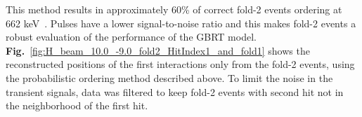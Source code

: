 This method results in approximately 60\% of correct fold-2 events ordering at 662 keV~\cite{Piqueras2004ADetectors}.
Pulses have a lower signal-to-noise ratio and this makes fold-2 events a robust evaluation of the performance of the GBRT model. \textbf{Fig.}~\ref{fig:H_beam_10.0_-9.0_fold2_HitIndex1_and_fold1} shows the reconstructed positions of the first interactions only from the fold-2 events, using the probabilistic ordering method described above. To limit the noise in the transient signals, data was filtered to keep fold-2 events with second hit not in the neighborhood of the first hit.



